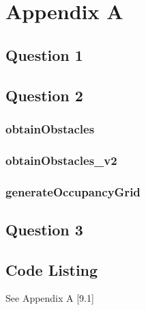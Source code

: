 \newpage
\renewcommand{\thesubsection}{\thesection.\arabic{subsection}}
\section{Appendix A}
	\subsection{Question 1}
	\pagebreak
	
	\subsection{Question 2}
	
		\subsubsection{obtainObstacles}

		\subsubsection{obtainObstacles_v2}
		
		\subsubsection{generateOccupancyGrid}
		
		\pagebreak
	
	\subsection{Question 3}
		
		
	\subsection*{Code Listing}
	See Appendix A [9.1]
	\\
	
	\pagebreak
	